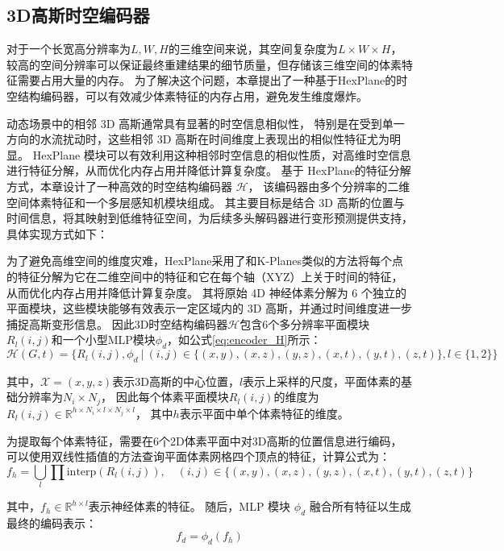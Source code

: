 \subsection{3D高斯时空编码器}
对于一个长宽高分辨率为$L, W, H$的三维空间来说，其空间复杂度为$L \times W \times H$，
较高的空间分辨率可以保证最终重建结果的细节质量，但存储该三维空间的体素特征需要占用大量的内存。
为了解决这个问题，本章提出了一种基于HexPlane\cite{hex_plane}的时空结构编码器，可以有效减少体素特征的内存占用，避免发生维度爆炸。

动态场景中的相邻 3D 高斯通常具有显著的时空信息相似性，
特别是在受到单一方向的水流扰动时，这些相邻 3D 高斯在时间维度上表现出的相似性特征尤为明显。
HexPlane 模块可以有效利用这种相邻时空信息的相似性质，对高维时空信息进行特征分解，从而优化内存占用并降低计算复杂度。
基于 HexPlane的特征分解方式，本章设计了一种高效的时空结构编码器 $\mathcal{H}$，
该编码器由多个分辨率的二维空间体素特征和一个多层感知机模块组成。
其主要目标是结合 3D 高斯的位置与时间信息，将其映射到低维特征空间，为后续多头解码器进行变形预测提供支持，具体实现方式如下：

为了避免高维空间的维度灾难，HexPlane采用了和K-Planes\cite{k-planes}类似的方法将每个点的特征分解为它在二维空间中的特征和它在每个轴（XYZ）上关于时间的特征，从而优化内存占用并降低计算复杂度。
其将原始 4D 神经体素分解为 6 个独立的平面模块，这些模块能够有效表示一定区域内的 3D 高斯，并通过时间维度进一步捕捉高斯变形信息。
因此3D时空结构编码器$\mathcal{H}$包含6个多分辨率平面模块$R_l(i,j)$和一个小型MLP模块$\phi_d$，如公式\ref{eq:encoder_H}所示：
\begin{equation}
\label{eq:encoder_H}
\mathcal{H}(G, t) = \{ R_l(i,j), \phi_d \ | \ (i,j) \in \{(x,y), (x,z), (y,z), (x,t), (y,t), (z,t)\}, l \in \{1, 2\} \}
\end{equation}

其中，$\mathcal{X} = (x, y, z)$表示3D高斯的中心位置，$l$表示上采样的尺度，平面体素的基础分辨率为$N_i \times N_j$，
因此每个体素平面模块$R_l(i,j)$的维度为$R_l(i,j) \in \mathbb{R}^{h \times N_i \times l \times N_j \times l}$，
其中$h$表示平面中单个体素特征的维度。

为提取每个体素特征，需要在6个2D体素平面中对3D高斯的位置信息进行编码，可以使用双线性插值的方法查询平面体素网格四个顶点的特征，计算公式为：
\begin{equation}
f_h = \bigcup_l \prod \text{interp}(R_l(i,j)), \quad (i,j) \in \{(x,y),(x,z),(y,z),(x,t),(y,t),(z,t)\}
\end{equation}

其中，$f_h \in \mathbb{R}^{h \times l}$表示神经体素的特征。
随后，MLP 模块 $\phi_d$ 融合所有特征以生成最终的编码表示：
\begin{equation}
f_d = \phi_d(f_h)
\end{equation}  

